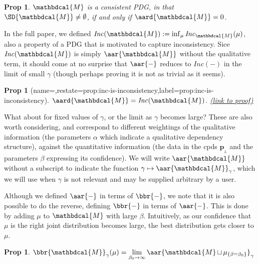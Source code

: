 \documentclass{article}
\theoremstyle{plain}
\newtheorem{prop}[theorem]{Prop}
\theoremstyle{definition}
\theoremstyle{remark}
\newcommand\mat[1]{\mathbf{#1}}
\newcommand{\bp}[1][L]{\mat{p}_{\!_{#1}\!}}
\newcommand{\V}{\mathcal V}
\newcommand{\dg}[1]{\mathbdcal{#1}}
\DeclareMathOperator{\bundle}{\sqcup}
\newcommand\Inc{\mathit{Inc}}
\newcommand{\begthm}[3][]{\begin{#2}[{name=#1},restate=#3,label=#3]}
\begin{document}
\begin{prop}
	$\dg M$ is a \emph{consistent} PDG, in that $\SD{\dg M} \ne \emptyset$,
	if and only if $\aard{\dg M} = 0$. 
\end{prop}



In the full paper, we defined
$\Inc(\dg M) := \inf_\mu \Inc_{\dg M}(\mu)$, also a property of 
a PDG that is motivated to capture inconsistency. 
Sice $\Inc(\dg M)$ is simply $\aar{\dg M}$ without the qualitative term,
it should come at no surprise that $\aar{-}$ reduces to $\Inc(-)$ in the limit
of small $\gamma$ (though perhaps proving it is not as trivial as it seems).

\begthm{prop}{prop:inc-is-inconsistency}
	$\displaystyle \aard{\dg M} = \Inc (\dg M)
	$.
	\hfill\hyperref[proof:inc-is-inconsistency]{(link to proof)}
\end{prop}

What about for fixed values of $\gamma$, or the limit as $\gamma$ becomes large?
These are also worth considering, and correspond to different weightings of the
qualitative information (the parameters $\alpha$ which indicate a qualitative
dependency structure), against the quantitative information (the data in the
cpds $\bp{}$ and the parameters $\beta$ expressing its confidence). 
We will write $\aar{\dg M}$ without a subscript to indicate the function
$\gamma \mapsto \aar{\dg M}_\gamma$, which we will use when $\gamma$ is not
relevant and may be supplied arbitrary by a user.

Although we defined $\aar{-}$ in terms of $\bbr{-}$, 
we note that it is also possible to do the reverse,
defining $\bbr{-}$ in terms of $\aar{-}$.
This is done by adding $\mu$ to $\dg M$ with large $\beta$. 
Intuitively, as our confidence that $\mu$ is the right
joint distribution becomes large, the best distribution
gets closer to $\mu$.

\begin{prop} \label{prop:sementics-via-inconsistency}
	$\displaystyle
		\bbr{\dg M}_\gamma(\mu) 
			= \lim_{\beta_0 \to \infty} \aar{\dg M \bundle \mu_{\{\beta=\beta_0\}}}_\gamma
	$
\end{prop}
\end{document}
